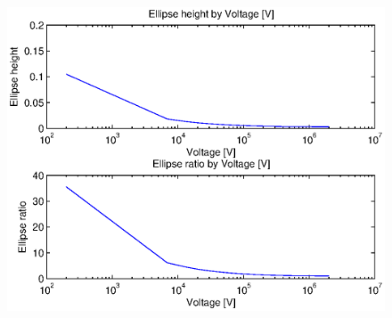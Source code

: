 \begin{figure}[tbh]
\includegraphics{figures/beam_deflection_script_07}
\centering
\caption{}
\label{fig:beam_deflection_script_07}
\end{figure}